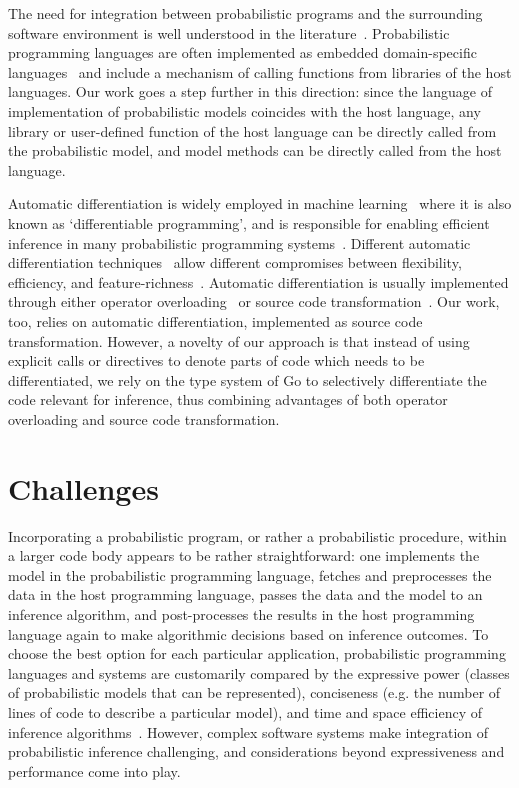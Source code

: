 \documentclass[sigplan,review,10pt,anonymous]{acmart}
\begin{document}
\begin{sloppypar}
The need for integration between probabilistic programs and the
surrounding software environment is well understood in the
literature~\cite{TMY+16,BCJ+19}. Probabilistic programming
languages are often implemented as embedded domain-specific
languages~\cite{SGG15,GXG18,TMY+16} and include a mechanism of
calling functions from libraries of the host languages. Our work
goes a step further in this direction: since the language of
implementation of probabilistic models coincides with the host
language, any library or user-defined function of the host
language can be directly called from the probabilistic model,
and model methods can be directly called from the host language.

Automatic differentiation is widely employed in machine
learning~\cite{BPR+17,MBB+18} where it is also known as
`differentiable programming', and is responsible for enabling
efficient inference in many probabilistic programming
systems~\cite{Stan17,GXG18,ISF+18,BCJ+19,THS+17}. Different
automatic differentiation techniques~\cite{GW08} allow 
different compromises between flexibility, efficiency, and
feature-richness~\cite{SDT14,PGC+17,ISF+18}.  Automatic
differentiation is usually implemented through either
operator overloading~\cite{Stan17,PGC+17,GXG18} or source
code transformation~\cite{ISF+18,MMW18}. Our work, too, relies
on automatic differentiation, implemented as source code
transformation. However, a novelty of our approach is that
instead of using explicit calls or directives to denote parts of
code which needs to be differentiated, we rely on the type
system of Go to selectively differentiate the code relevant for
inference, thus combining advantages of both operator
overloading and source code transformation.

\section{Challenges}

Incorporating a probabilistic program, or rather a probabilistic
procedure, within a larger code body appears to be rather
straightforward: one implements the model in the probabilistic
programming language, fetches and preprocesses the data in the
host programming language, passes the data and the model to an
inference algorithm, and post-processes the results in the host
programming language again to make algorithmic decisions based
on inference outcomes. To choose the best option for each
particular application, probabilistic programming languages and
systems are customarily compared by the expressive power
(classes of probabilistic models that can be represented),
conciseness (e.g.  the number of lines of code to describe a
particular model), and time and space efficiency of inference
algorithms~\cite{WVM14,P16,R17,GXG18}.  However, complex
software systems make integration of probabilistic inference
challenging, and considerations beyond expressiveness
and performance come into play.


\end{sloppypar}
\end{document}
